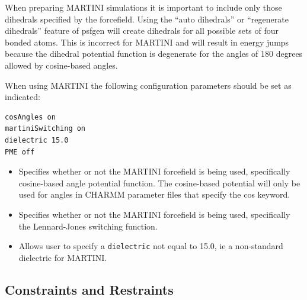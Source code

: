 When preparing MARTINI simulations it is important to include only those
dihedrals specified by the forcefield.  Using the ``auto dihedrals'' or 
``regenerate dihedrals'' feature of psfgen will create dihedrals for all
possible sets of four bonded atoms.  This is incorrect for MARTINI and
will result in energy jumps because the dihedral potential function is
degenerate for the angles of 180 degrees allowed by cosine-based angles.

When using MARTINI the following configuration parameters should be set as indicated:

\begin{verbatim}
cosAngles on
martiniSwitching on
dielectric 15.0
PME off
\end{verbatim}

\begin{itemize}

\item
{}
{Specifies whether or not the MARTINI forcefield is being used, specifically cosine-based angle potential function.
The cosine-based potential will only be used for angles in CHARMM parameter files that specify the cos keyword.} 

\item
{}
{Specifies whether or not the MARTINI forcefield is being used, specifically the Lennard-Jones switching function.} 

\item
{}
{Allows user to specify a {\tt dielectric} not equal to 15.0, ie a non-standard dielectric for MARTINI.}

\end{itemize}


\subsection{Constraints and Restraints}

